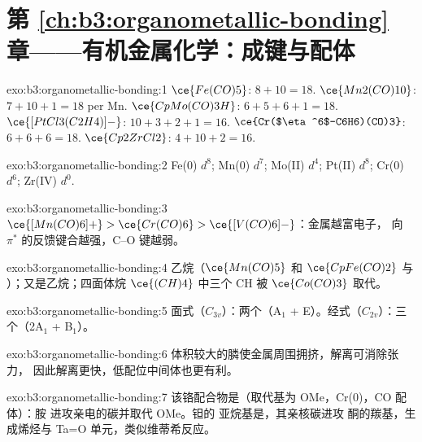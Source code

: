 \section*{第 \ref{ch:b3:organometallic-bonding} 章——有机金属化学：成键与配体}

\begin{solution}{exo:b3:organometallic-bonding:1}
$\ce{Fe(CO)5}$: $8 + 10 = 18$. $\ce{Mn2(CO)10}$: $7 + 10 + 1 = 18$ per Mn. $\ce{CpMo(CO)3H}$: $6 + 5 + 6 + 1 =
18$. $\ce{[PtCl3(C2H4)]-}$: $10 + 3 + 2 + 1 = 16$. $\ce{Cr($\eta^6$-C6H6)(CO)3}$: $6 + 6 + 6 = 18$. $\ce{Cp2ZrCl2}$:
$4 + 10 + 2 = 16$.
\end{solution}

\begin{solution}{exo:b3:organometallic-bonding:2}
Fe(0) $d^8$; Mn(0) $d^7$; Mo(II) $d^4$; Pt(II) $d^8$; Cr(0) $d^6$; Zr(IV) $d^0$.
\end{solution}

\begin{solution}{exo:b3:organometallic-bonding:3}
$\ce{[Mn(CO)6]+} > \ce{Cr(CO)6} > \ce{[V(CO)6]-}$：金属越富电子，
向 $\pi^*$ 的反馈键合越强，C--O 键越弱。
\end{solution}

\begin{solution}{exo:b3:organometallic-bonding:4}
乙烷（$\ce{Mn(CO)5}$ 和 $\ce{CpFe(CO)2}$ 与  ）；又是乙烷；四面体烷
$\ce{(CH)4}$ 中三个 CH 被 $\ce{Co(CO)3}$ 取代。
\end{solution}

\begin{solution}{exo:b3:organometallic-bonding:5}
面式（$C_{3v}$）：两个（A$_1$ + E）。经式（$C_{2v}$）：三个（2A$_1$ + B$_1$）。
\end{solution}

\begin{solution}{exo:b3:organometallic-bonding:6}
体积较大的膦使金属周围拥挤，解离可消除张力，
因此解离更快，低配位中间体也更有利。
\end{solution}

\begin{solution}{exo:b3:organometallic-bonding:7}
该铬配合物是（取代基为 OMe，Cr(0)，CO 配体）：胺
进攻亲电的碳并取代 OMe。钽的
亚烷基是，其亲核碳进攻
酮的羰基，生成烯烃与 Ta=O 单元，类似维蒂希反应。
\end{solution}

